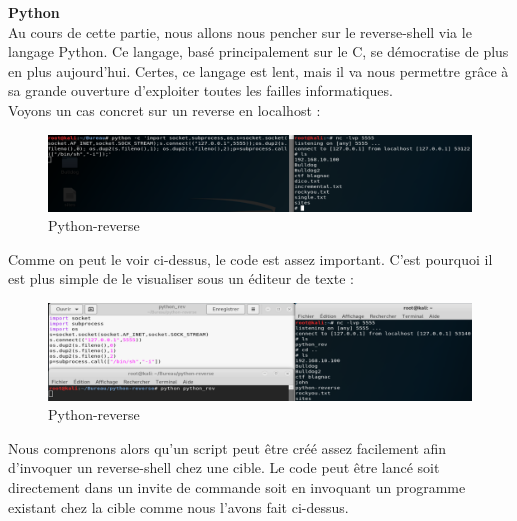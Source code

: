  \textbf{Python}\\

Au cours de cette partie, nous allons nous pencher sur le reverse-shell via le langage Python. Ce langage, basé principalement sur le C, se démocratise de plus en plus aujourd'hui. Certes, ce langage est lent, mais il va nous permettre grâce à sa grande ouverture d'exploiter toutes les failles informatiques.\\

Voyons un cas concret sur un reverse en localhost :

\begin{figure}[htp!]
  \centering
  \setlength\figureheight{9cm}
  \setlength\figurewidth{7cm}
  \includegraphics[width=1\textwidth]{oui/Ancien/imangeancien/Reverse-Shell/Python/python-reverse.PNG}
  \caption{Python-reverse}
  \label{fig:courbe-tikz}
\end{figure}

Comme on peut le voir ci-dessus, le code est assez important. C'est pourquoi il est plus simple de le visualiser sous un éditeur de texte :

\begin{figure}[htp!]
  \centering
  \setlength\figureheight{9cm}
  \setlength\figurewidth{7cm}
  \includegraphics[width=1\textwidth]{oui/Ancien/imangeancien/Reverse-Shell/Python/python_code.PNG}
  \caption{Python-reverse}
  \label{fig:courbe-tikz}
\end{figure}

Nous comprenons alors qu'un script peut être créé assez facilement afin d'invoquer un reverse-shell chez une cible. Le code peut être lancé soit directement dans un invite de commande soit en invoquant un programme existant chez la cible comme nous l'avons fait ci-dessus.






